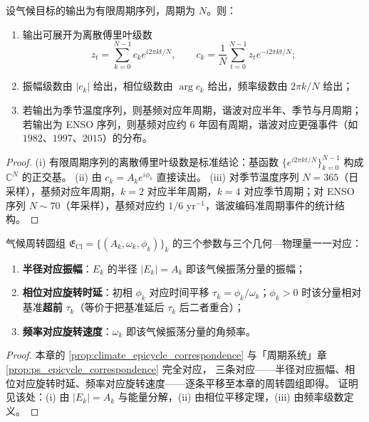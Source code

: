 \begin{theorem}[由气候数据构建周期级数]\label{thm:climate_series_reconstruction}
设气候目标的输出为有限周期序列，周期为 $N$。则：
\begin{enumerate}[label=(\roman*)]
    \item 输出可展开为离散傅里叶级数
    \[
    z_t=\sum_{k=0}^{N-1}c_k e^{i2\pi kt/N},\qquad
    c_k=\frac1N\sum_{t=0}^{N-1}z_t e^{-i2\pi kt/N};
    \]
    \item 振幅级数由 $|c_k|$ 给出，相位级数由 $\arg c_k$ 给出，频率级数由 $2\pi k/N$ 给出；
    \item 若输出为季节温度序列，则基频对应年周期，谐波对应半年、季节与月周期；若输出为 ENSO 序列，则基频对应约 $6$ 年固有周期，谐波对应更强事件（如 $1982$、$1997$、$2015$）的分布。
\end{enumerate}
\end{theorem}

\begin{proof}
(i) 有限周期序列的离散傅里叶级数是标准结论：基函数 $\{e^{i2\pi kt/N}\}_{k=0}^{N-1}$ 构成 $\mathbb C^N$ 的正交基。
(ii) 由 $c_k=A_k e^{i\phi_k}$ 直接读出。
(iii) 对季节温度序列 $N=365$（日采样），基频对应年周期，$k=2$ 对应半年周期，$k=4$ 对应季节周期；对 ENSO 序列 $N\sim70$（年采样），基频对应约 $1/6$ yr$^{-1}$，谐波编码准周期事件的统计结构。
\end{proof}

\begin{proposition}\label{prop:climate_epicycle_correspondence}
气候周转圆组 $\mathfrak E_{\mathrm{Cl}}=\{(A_k,\omega_k,\phi_k)\}_{k}$ 的三个参数与三个几何—物理量一一对应：
\begin{enumerate}[label=(\roman*)]
    \item \textbf{半径对应振幅}：$E_k$ 的半径 $|E_k|=A_k$ 即该气候振荡分量的振幅；
    \item \textbf{相位对应旋转时延}：初相 $\phi_k$ 对应时间平移 $\tau_k=\phi_k/\omega_k$；$\phi_k>0$ 时该分量相对基准\textbf{超前} $\tau_k$（等价于把基准延后 $\tau_k$ 后二者重合）；
    \item \textbf{频率对应旋转速度}：$\omega_k$ 即该气候振荡分量的角频率。
\end{enumerate}
\end{proposition}

\begin{proof}
本章的 \cref{prop:climate_epicycle_correspondence} 与「周期系统」章 \cref{prop:ps_epicycle_correspondence} 完全对应，
三条对应——半径对应振幅、相位对应旋转时延、频率对应旋转速度——逐条平移至本章的周转圆组即得。
证明见该处：(i) 由 $|E_k|=A_k$ 与能量分解，(ii) 由相位平移定理，(iii) 由频率级数定义。
\end{proof}

